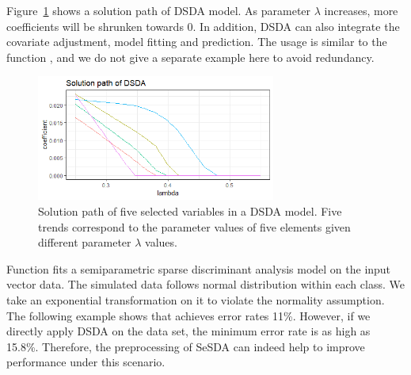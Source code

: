   
  
  Figure~\ref{fig:dsdasp} shows a solution path of DSDA model. As parameter $\lambda$ increases, more coefficients will be shrunken towards 0. In addition, DSDA can also integrate the covariate adjustment, model fitting and prediction. The usage is similar to the function , and we do not give a separate example here to avoid redundancy.
  \begin{figure}[!t]
  \centering
  \includegraphics[width=0.7\textwidth]{pic/dsda_sp.png}
  \caption{Solution path of five selected variables in a DSDA model. Five trends correspond to the parameter values of five elements given different parameter $\lambda$ values. }
  \label{fig:dsdasp}
  \end{figure} 
  
  
  
  
  
  
  
  
  
  
  
  
  
  Function  fits a semiparametric sparse discriminant analysis model on the input vector data. The simulated data  follows normal distribution within each class. We take an exponential transformation on it to violate the normality assumption. The following example shows that  achieves error rates 11\%. However, if we directly apply DSDA on the data set, the minimum error rate is as high as 15.8\%. Therefore, the preprocessing of SeSDA can indeed help to improve performance under this scenario.
  
  
  
